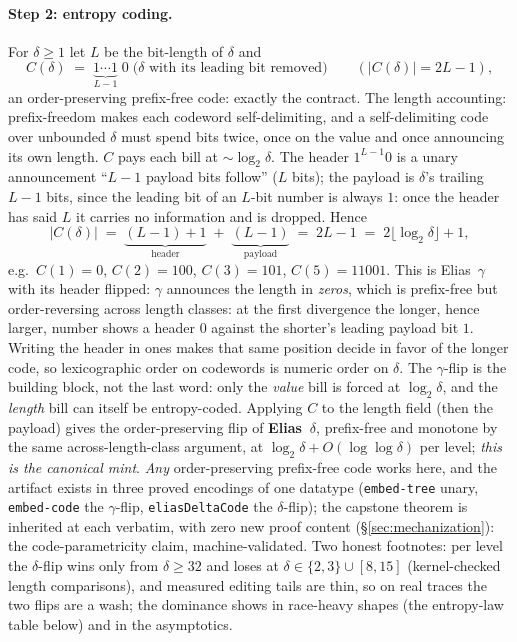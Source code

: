 \documentclass[11pt]{article}
\newcommand{\code}[1]{\texttt{#1}}
\begin{document}
\paragraph{Step 2: entropy coding.} For $\delta \ge 1$ let $L$ be the
bit-length of $\delta$ and
\[
  C(\delta) \;=\; \underbrace{1\cdots1}_{L-1}\;0\;\bigl(\delta
  \text{ with its leading bit removed}\bigr)
  \qquad (|C(\delta)| = 2L-1),
\]
an order-preserving prefix-free code: exactly the contract. The
length accounting: prefix-freedom makes each codeword
self-delimiting, and a self-delimiting code over unbounded $\delta$
must spend bits twice, once on the value and once announcing its own
length. $C$ pays each bill at $\sim\!\log_2\delta$. The header
$1^{L-1}0$ is a unary announcement ``$L{-}1$ payload bits follow''
($L$ bits); the payload is $\delta$'s trailing $L{-}1$ bits, since
the leading bit of an $L$-bit number is always $1$: once the header
has said $L$ it carries no information and is dropped. Hence
\[
  |C(\delta)| \;=\; \underbrace{(L{-}1) + 1}_{\text{header}}
  \;+\; \underbrace{(L{-}1)}_{\text{payload}}
  \;=\; 2L - 1 \;=\; 2\lfloor \log_2 \delta \rfloor + 1,
\]
e.g.\ $C(1) = 0$, $C(2) = 100$, $C(3) = 101$, $C(5) = 11001$. This
is Elias~$\gamma$ with
its header flipped: $\gamma$ announces the length in \emph{zeros},
which is prefix-free but order-reversing across length classes:
at the first divergence the longer, hence larger, number shows a
header $0$ against the shorter's leading payload bit $1$. Writing
the header in ones makes that same position decide in favor of the
longer code, so lexicographic order on codewords is numeric order on
$\delta$. The $\gamma$-flip is the building block, not the last
word: only the \emph{value} bill is forced at $\log_2 \delta$, and
the \emph{length} bill can itself be entropy-coded. Applying $C$ to
the length field (then the payload) gives the order-preserving flip
of \textbf{Elias~$\delta$}, prefix-free and monotone by the same
across-length-class argument, at $\log_2 \delta + O(\log \log
\delta)$ per level; \emph{this is the canonical mint}.
\emph{Any} order-preserving prefix-free
code works here, and the artifact exists in three proved encodings
of one datatype (\code{embed-tree} unary, \code{embed-code} the
$\gamma$-flip, \code{eliasDeltaCode} the $\delta$-flip); the capstone
theorem is inherited at each verbatim, with zero new proof content
(\S\ref{sec:mechanization}): the code-parametricity claim,
machine-validated. Two honest footnotes: per level the $\delta$-flip
wins only from $\delta \ge 32$ and loses at $\delta \in \{2,3\} \cup
[8,15]$ (kernel-checked length comparisons), and measured editing
tails are thin, so on real traces the two flips are a wash; the
dominance shows in race-heavy shapes (the entropy-law table below)
and in the asymptotics.
\end{document}
